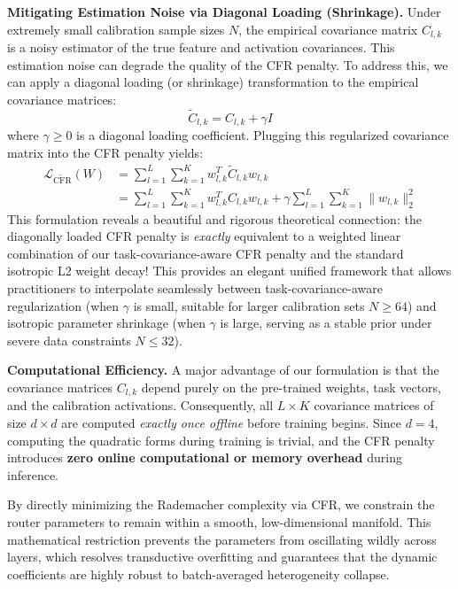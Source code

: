 \textbf{Mitigating Estimation Noise via Diagonal Loading (Shrinkage).}
Under extremely small calibration sample sizes $N$, the empirical covariance matrix $C_{l, k}$ is a noisy estimator of the true feature and activation covariances. This estimation noise can degrade the quality of the CFR penalty. To address this, we can apply a diagonal loading (or shrinkage) transformation to the empirical covariance matrices:
\begin{equation}
    \tilde{C}_{l, k} = C_{l, k} + \gamma I
\end{equation}
where $\gamma \geq 0$ is a diagonal loading coefficient. Plugging this regularized covariance matrix into the CFR penalty yields:
\begin{align}
    \mathcal{L}_{\tilde{\text{CFR}}}(W) &= \sum_{l=1}^L \sum_{k=1}^K w_{l, k}^T \tilde{C}_{l, k} w_{l, k} \nonumber \\
    &= \sum_{l=1}^L \sum_{k=1}^K w_{l, k}^T C_{l, k} w_{l, k} + \gamma \sum_{l=1}^L \sum_{k=1}^K \|w_{l, k}\|_2^2
\end{align}
This formulation reveals a beautiful and rigorous theoretical connection: the diagonally loaded CFR penalty is \emph{exactly} equivalent to a weighted linear combination of our task-covariance-aware CFR penalty and the standard isotropic L2 weight decay! This provides an elegant unified framework that allows practitioners to interpolate seamlessly between task-covariance-aware regularization (when $\gamma$ is small, suitable for larger calibration sets $N \geq 64$) and isotropic parameter shrinkage (when $\gamma$ is large, serving as a stable prior under severe data constraints $N \leq 32$).

\textbf{Computational Efficiency.} A major advantage of our formulation is that the covariance matrices $C_{l, k}$ depend purely on the pre-trained weights, task vectors, and the calibration activations. Consequently, all $L \times K$ covariance matrices of size $d \times d$ are computed \emph{exactly once offline} before training begins. Since $d=4$, computing the quadratic forms during training is trivial, and the CFR penalty introduces \textbf{zero online computational or memory overhead} during inference.

By directly minimizing the Rademacher complexity via CFR, we constrain the router parameters to remain within a smooth, low-dimensional manifold. This mathematical restriction prevents the parameters from oscillating wildly across layers, which resolves transductive overfitting and guarantees that the dynamic coefficients are highly robust to batch-averaged heterogeneity collapse.

